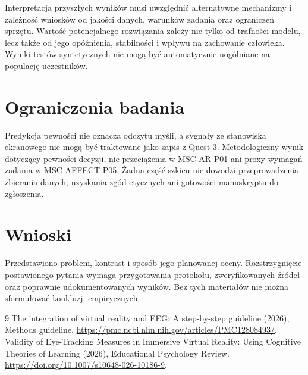 \documentclass[11pt,a4paper]{article}
\begin{document}
Interpretacja przyszłych wyników musi uwzględnić alternatywne mechanizmy i zależność wniosków od jakości danych, warunków zadania oraz ograniczeń sprzętu. Wartość potencjalnego rozwiązania zależy nie tylko od trafności modelu, lecz także od jego opóźnienia, stabilności i wpływu na zachowanie człowieka. Wyniki testów syntetycznych nie mogą być automatycznie uogólniane na populację uczestników.

\section{Ograniczenia badania}

Predykcja pewności nie oznacza odczytu myśli, a sygnały ze stanowiska ekranowego nie mogą być traktowane jako zapis z Quest 3. Metodologiczny wynik dotyczący pewności decyzji, nie przeciążenia w MSC-AR-P01 ani proxy wymagań zadania w MSC-AFFECT-P05. Żadna część szkicu nie dowodzi przeprowadzenia zbierania danych, uzyskania zgód etycznych ani gotowości manuskryptu do zgłoszenia.

\section{Wnioski}

Przedstawiono problem, kontrast i sposób jego planowanej oceny. Rozstrzygnięcie postawionego pytania wymaga przygotowania protokołu, zweryfikowanych źródeł oraz poprawnie udokumentowanych wyników. Bez tych materiałów nie można sformułować konkluzji empirycznych.

\begin{thebibliography}{9}
 The integration of virtual reality and EEG: A step-by-step guideline (2026), Methods guideline. \url{https://pmc.ncbi.nlm.nih.gov/articles/PMC12808493/}.
 Validity of Eye-Tracking Measures in Immersive Virtual Reality: Using Cognitive Theories of Learning (2026), Educational Psychology Review. \url{https://doi.org/10.1007/s10648-026-10186-9}.
\end{thebibliography}
\end{document}
